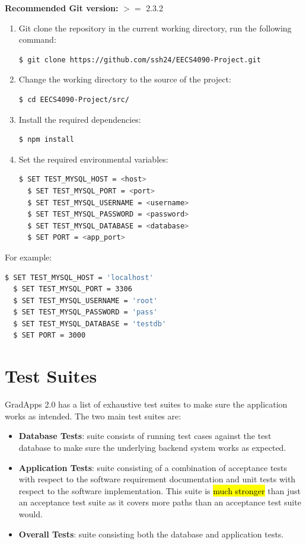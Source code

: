 \documentclass[fontsize=12pt,paper=letter,twoside]{scrartcl}
\begin{document}
\bigskip
\noindent \textbf{Recommended Git version:} $>=$ 2.3.2

\smallskip
\begin{enumerate}
\item Git clone the repository in the current working directory, run the following command:
\begin{lstlisting}[language=bash]
  $ git clone https://github.com/ssh24/EECS4090-Project.git
\end{lstlisting}
\item Change the working directory to the source of the project:
\begin{lstlisting}[language=bash]
  $ cd EECS4090-Project/src/
\end{lstlisting}
\item Install the required dependencies:
\begin{lstlisting}[language=bash]
  $ npm install
\end{lstlisting}
\item Set the required environmental variables:
\begin{lstlisting}[language=bash]
  $ SET TEST_MYSQL_HOST = <host>
  $ SET TEST_MYSQL_PORT = <port>
  $ SET TEST_MYSQL_USERNAME = <username>
  $ SET TEST_MYSQL_PASSWORD = <password>
  $ SET TEST_MYSQL_DATABASE = <database>
  $ SET PORT = <app_port>
\end{lstlisting}
\end{enumerate}

\smallskip
\noindent For example:
\begin{lstlisting}[language=bash]
  $ SET TEST_MYSQL_HOST = 'localhost'
  $ SET TEST_MYSQL_PORT = 3306
  $ SET TEST_MYSQL_USERNAME = 'root'
  $ SET TEST_MYSQL_PASSWORD = 'pass'
  $ SET TEST_MYSQL_DATABASE = 'testdb'
  $ SET PORT = 3000
\end{lstlisting}

\newpage
\section{Test Suites}
GradApps 2.0 has a list of exhaustive test suites to make sure the application works as intended. The two main test suites are:

\begin{itemize}
\item \textbf{Database Tests}: suite consists of running test cases against the test database to make sure the underlying backend system works as expected.
\item \textbf{Application Tests}: suite consisting of a combination of acceptance tests with respect to the software requirement documentation and unit tests with respect to the software implementation. This suite is \hl{much stronger} than just an acceptance test suite as it covers more paths than an acceptance test suite would.
\item \textbf{Overall Tests}: suite consisting both the database and application tests.
\end{itemize}
\end{document}
